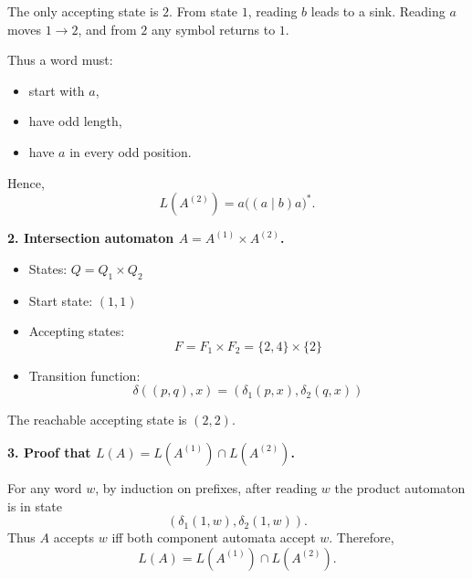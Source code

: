 \documentclass[11pt, a4paper]{article}
\theoremstyle{definition}
\theoremstyle{remark}
\begin{document}
The only accepting state is $2$. From state $1$, reading $b$ leads to a sink.
Reading $a$ moves $1 \to 2$, and from $2$ any symbol returns to $1$.

Thus a word must:
\begin{itemize}
\item start with $a$,
\item have odd length,
\item have $a$ in every odd position.
\end{itemize}

Hence,
\[
L(A^{(2)}) = a\big((a\mid b)a\big)^*.
\]

\medskip
\textbf{2. Intersection automaton $A = A^{(1)} \times A^{(2)}$.}

\begin{itemize}
\item States: $Q = Q_1 \times Q_2$
\item Start state: $(1,1)$
\item Accepting states:
\[
F = F_1 \times F_2 = \{2,4\}\times\{2\}
\]
\item Transition function:
\[
\delta((p,q),x) = (\delta_1(p,x), \delta_2(q,x))
\]
\end{itemize}

The reachable accepting state is $(2,2)$.

\begin{center}
\end{center}

\medskip
\textbf{3. Proof that $L(A)=L(A^{(1)})\cap L(A^{(2)})$.}

For any word $w$, by induction on prefixes, after reading $w$ the product automaton is in state
\[
(\delta_1(1,w),\delta_2(1,w)).
\]
Thus $A$ accepts $w$ iff both component automata accept $w$.
Therefore,
\[
L(A)=L(A^{(1)})\cap L(A^{(2)}).
\]
\end{document}
